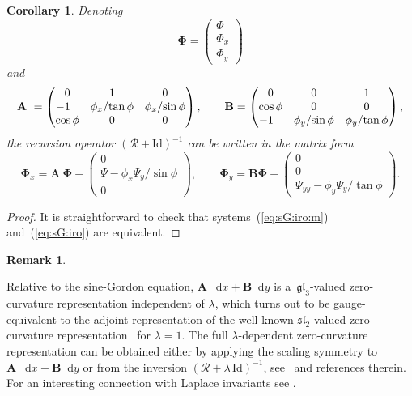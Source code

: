 \documentclass[pdftex]{sigma}
\def\eqref#1{{\rm(\ref{#1})}}
\def\dif{\mathop{}\!\mathrm d}
\def\RO{{\mathcal R}}
\numberwithin{equation}{section}
\newtheorem{Corollary}[Theorem]{Corollary}
\theoremstyle{definition}
\newtheorem{Remark}[Theorem]{Remark}
\begin{document}
\begin{Corollary}
Denoting
\[
\mathbf \Phi = \left(\begin{matrix}
 \Phi \\ \Phi_{x} \\ \Phi_{y}
\end{matrix}\right)
\]
and
\[
\mathbf A~= \left(\begin{matrix}
 0 & 1 & 0 \\
 \llap{$-$}1 & {\phi_x}/{\tan\phi} &
 {\phi_x}/{\sin\phi}
\\
 \cos\phi & 0 & 0
\end{matrix}\right),
\qquad
\mathbf B = \left(\begin{matrix}
 0 & 0 & 1 \\
 \cos\phi & 0 & 0 \\
 \llap{$-$}1 & {\phi_y}/{\sin\phi} &
 \phi_y/{\tan\phi}
\end{matrix}\right),
\]
the recursion operator $(\RO + \mathrm{Id})^{-1}$ can be written in the matrix
form
\begin{equation}
\label{eq:sG:iro:m}
\mathbf \Phi_x
 = \mathbf A~\mathbf \Phi
+ \left(\begin{matrix}
 0 \\
 \Psi - \phi_x\Psi_y/{\sin\phi} \\
 0
\end{matrix}\right),
\qquad
\mathbf \Phi_y
 = \mathbf B \mathbf \Phi
+ \left(\begin{matrix}
 0 \\
 0 \\
 \Psi_{yy} - \phi_y \Psi_y/{\tan\phi}
\end{matrix}\right).
\end{equation}
\end{Corollary}


\begin{proof}
It is straightforward to check that systems~\eqref{eq:sG:iro:m}
and~\eqref{eq:sG:iro} are equivalent.
\end{proof}



\begin{Remark}
\label{rem:lambda}

Relative to the sine-Gordon equation,
$\mathbf A~\dif x + \mathbf B \dif y$
is a~$\mathfrak{gl}_3$-valued zero-curvature representation
independent of $\lambda$,
which turns out to be gauge-equivalent to the adjoint representation
of the well-known $\mathfrak{sl}_2$-valued zero-curvature
representation~\cite{A-K-N-S,Z-T-F-1974} for
$\lambda = 1$.
The full $\lambda$-dependent zero-curvature representation
can be obtained either by applying the scaling symmetry to
$\mathbf A~\dif x + \mathbf B \dif y$ or from the inversion
$(\RO + \lambda\,\mathrm{Id})^{-1}$,
see~\cite[p.~252]{MM-spp} and references therein.
For an interesting connection with Laplace invariants see
\cite{H-Kh-P-2016}.
\end{Remark}
\end{document}
